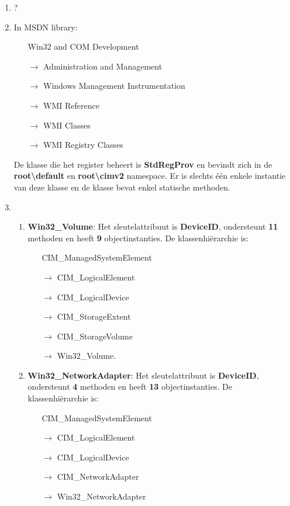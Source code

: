 \documentclass{report}
\begin{document}
\begin{enumerate}
			\item ?
			\item In MSDN library: 
			\begin{itemize}
				\item[] Win32 and COM Development
				\item[$\rightarrow$] Administration and Management
				\item[$\rightarrow$] Windows Management Instrumentation
				\item[$\rightarrow$] WMI Reference
				\item[$\rightarrow$] WMI Classes
				\item[$\rightarrow$] WMI Registry Classes
			\end{itemize}
			De klasse die het register beheert is \textbf{StdRegProv} en bevindt zich in de \textbf{root\textbackslash default} en \textbf{root\textbackslash cimv2} namespace. Er is slechts één enkele instantie van deze klasse en de klasse bevat enkel statische methoden.
			\item 
				\begin{enumerate}
					\item \textbf{Win32\_Volume}: Het sleutelattribuut is \textbf{DeviceID}, ondersteunt \textbf{11} methoden en heeft \textbf{9} objectinstanties. De klassenhiërarchie is: 
					\begin{itemize}
						\item[] CIM\_ManagedSystemElement 
						\item[$\rightarrow$] CIM\_LogicalElement
						\item[$\rightarrow$] CIM\_LogicalDevice
						\item[$\rightarrow$] CIM\_StorageExtent
						\item[$\rightarrow$] CIM\_StorageVolume
						\item[$\rightarrow$] Win32\_Volume.
					\end{itemize}
					
	
					
					\item \textbf{Win32\_NetworkAdapter}: Het sleutelattribuut is \textbf{DeviceID}, ondersteunt \textbf{4} methoden en heeft \textbf{13} objectinstanties. De klassenhiërarchie is:
					\begin{itemize}
						\item[] CIM\_ManagedSystemElement 
						\item[$\rightarrow$] CIM\_LogicalElement
						\item[$\rightarrow$] CIM\_LogicalDevice
						\item[$\rightarrow$] CIM\_NetworkAdapter
						\item[$\rightarrow$] Win32\_NetworkAdapter


\end{itemize}
\end{enumerate}
\end{enumerate}
\end{document}

